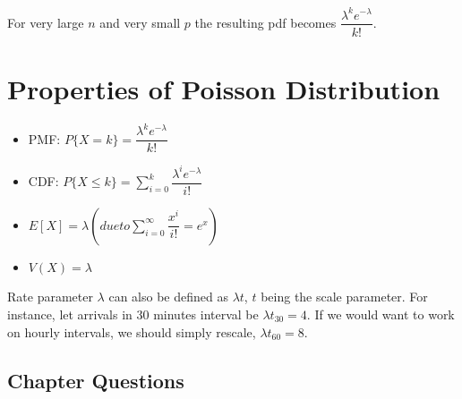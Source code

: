 \documentclass[]{book}
\theoremstyle{definition}
\theoremstyle{definition}
\theoremstyle{definition}
\theoremstyle{remark}
\begin{document}
For very large \(n\) and very small \(p\) the resulting pdf becomes
\(\dfrac{\lambda^k e^{-\lambda}}{k!}\).

\hypertarget{properties-of-poisson-distribution}{%
\chapter{Properties of Poisson
Distribution}\label{properties-of-poisson-distribution}}

\begin{itemize}
\item
  PMF: \(P\{X = k\} = \dfrac{\lambda^k e^{-\lambda}}{k!}\)
\item
  CDF:
  \(P\{X \le k\} = \sum_{i=0}^k \dfrac{\lambda^i e^{-\lambda}}{i!}\)
\item
  \(E[X] = \lambda (due to \sum_{i=0}^\infty\dfrac{x^i}{i!} = e^x)\)
\item
  \(V(X) = \lambda\)
\end{itemize}

Rate parameter \(\lambda\) can also be defined as \(\lambda t\), \(t\)
being the scale parameter. For instance, let arrivals in 30 minutes
interval be \(\lambda t_{30} = 4\). If we would want to work on hourly
intervals, we should simply rescale, \(\lambda t_{60} = 8\).

\hypertarget{chapter-questions}{%
\section{Chapter Questions}\label{chapter-questions}}
\end{document}
